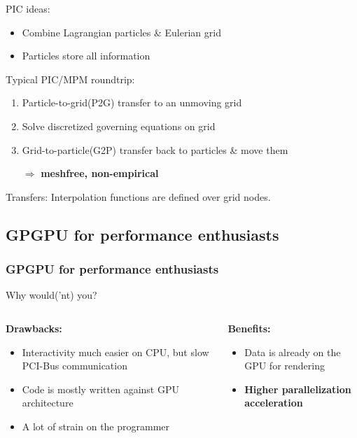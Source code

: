 \documentclass{beamer}
\begin{document}
\begin{frame}
PIC ideas:
\vfill
\begin{minipage}{0.45\paperwidth}
\begin{itemize}
    \item Combine Lagrangian particles \& Eulerian grid    \item Particles store all information
\end{itemize}
\vfill
Typical PIC/MPM roundtrip:
\vfill
\begin{enumerate}
  \item Particle-to-grid(P2G) transfer to an unmoving grid
    \item Solve discretized governing equations on grid
    \item Grid-to-particle(G2P) transfer back to particles \& move them
    \item[$\Rightarrow$] \textbf{meshfree, non-empirical}
\end{enumerate}
\end{minipage}
\begin{minipage}{0.35\paperwidth}
	
	\tiny{Transfers: Interpolation functions are defined over grid nodes.}
\end{minipage}
\end{frame}
\subsection{GPGPU for performance enthusiasts}
\begin{frame}
  \frametitle{GPGPU for performance enthusiasts}
  Why would('nt) you?
  \vfill
  \begin{columns}[T]
    \begin{column}{0.45\textwidth}
      \textbf{Drawbacks:}
    \begin{itemize}
      \item Interactivity much easier on CPU, but slow PCI-Bus communication
      \item Code is mostly written against GPU architecture
      \item A lot of strain on the programmer
    \end{itemize}
    \end{column}
    \begin{column}{0.45\textwidth}
      \textbf{Benefits:}
    \begin{itemize}
      \item Data is already on the GPU for rendering
      \item \textbf{Higher parallelization acceleration}
    \end{itemize}
    \end{column}
  \end{columns}
\end{frame}
\end{document}
